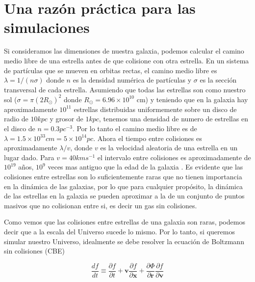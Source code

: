 \section{Una razón práctica para las simulaciones}

Si consideramos las dimensiones de nuestra galaxia, podemos calcular el camino medio libre de una estrella antes de que colisione con otra estrella. En un sistema de partículas que se mueven en orbitas rectas, el camino medio libre es $\lambda = 1/(n\sigma)$ donde $n$ es la densidad numérica de partículas y $\sigma$ es la sección transversal de cada estrella. Asumiendo que todas las estrellas son como nuestro sol ($\sigma = \pi(2R_\odot)^2 $ donde $R_\odot = 6.96\times 10^{10}$ cm) y teniendo que en la galaxia hay aproximadamente $10^{11}$ estrellas distribuidas uniformemente sobre un disco de radio de $10 kpc$ y grosor de $1 kpc$, tenemos una densidad de numero de estrellas en el disco de $n=0.3pc^{-3}$. Por lo tanto el camino medio libre es de $\lambda = 1.5 \times 10^{33} cm = 5\times 10^{14}pc$. Ahora el tiempo entre colisiones es aproximadamente $\lambda / v$, donde $v$ es la velocidad aleatoria de una estrella en un lugar dado. Para $v=40km s^{-1}$ el intervalo entre colisiones es aproximadamente de $10^{19}$ años, $10^9$ veces mas antiguo que la edad de la galaxia \cite{Binney1988-rs}. Es evidente que las colisiones entre estrellas son lo suficientemente raras que no tienen importancia en la dinámica de las galaxias, por lo que para cualquier propósito, la dinámica de las estrellas en la galaxia se pueden aproximar a la de un conjunto de puntos masivos que no colisionan entre si, es decir un gas sin colisiones.

Como vemos que las colisiones entre estrellas de una galaxia son raras, podemos decir que a la escala del Universo sucede lo mismo. Por lo tanto, si queremos simular nuestro Universo, idealmente se debe resolver la ecuación de Boltzmann sin colisiones (CBE)

\begin{equation}
    \frac{d f}{d t} \equiv \frac{\partial f}{\partial t} + \mathbf{v}\frac{\partial f}{\partial \mathbf{x}} + \frac{\partial \Phi}{\partial \mathbf{r}} \frac{\partial f}{\partial \mathbf{v}}
    \label{eq:CBE}
\end{equation}

